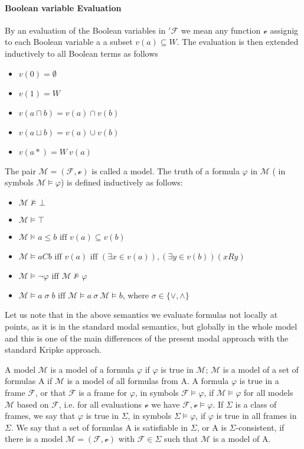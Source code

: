 \documentclass{article}
\begin{document}
	\paragraph{Boolean variable Evaluation}
By  an evaluation of the Boolean variables in $'\mathcal{F}$ we mean any function $\mathscr{v}$ assignig to each Boolean variable a a subset $v(a) \subseteq W$. The evaluation is then extended inductively to all Boolean terms as follows
		\begin{itemize}
			\item $v(0) = \emptyset$
			\item $v(1) = W$
			\item $v(a \sqcap b) = v(a) \cap v(b)$
			\item $v(a \sqcup b) = v(a) \cup v(b)$
			\item $v(a*) = W \ v(a)$
		\end{itemize}

The pair $\mathcal{M} = (\mathcal{F}, \mathscr{v})$ is called a model. The truth of a formula $\varphi$ in $\mathcal{M}$ ( in symbols $\mathcal{M} \models \varphi$) is defined inductively as follows:
		\begin{itemize}
			\item $\mathcal{M} \not\models \bot$ 
			\item $\mathcal{M} \models \top$
			\item $\mathcal{M} \models a \leq b \text{ iff } v(a) \subseteq v(b)$
			\item $\mathcal{M} \models aCb \text{ iff } v(a) \text{ iff } (\exists x \in v(a)), (\exists y \in v(b)) (xRy)$
			\item $\mathcal{M} \models \neg \varphi \text{ iff } \mathcal{M} \not\models \varphi$
			\item $\mathcal{M} \models a \; \sigma \; b \text{ iff } \mathcal{M} \models a \: \sigma \: \mathcal{M} \models b$, where $\sigma \in \{ \vee, \wedge \}$
		\end{itemize}
Let us note that in the above semantics we evaluate formulas not locally at points, as it is in the standard modal semantics, but globally in the whole model and this is one of the main differences of the present modal approach with the standard Kripke approach.

A model $\mathcal{M}$ is a model of a formula $\varphi$  if $\varphi$ is true in $\mathcal{M}$; $\mathcal{M}$ is a model of a set of formulas A if $\mathcal{M}$ is 
a model of all formulas from A. A formula $\varphi$ is true in a frame $\mathcal{F}$, or that $\mathcal{F}$ is a frame for $\varphi$, in symbols $\mathcal{F} \models \varphi$,
if $\mathcal{M} \models \varphi$ for all models $\mathcal{M}$ based on $\mathcal{F}$, i.e. for all evaluations $\mathscr{v}$ we have $\mathcal{F}, \mathscr{v} \models \varphi$.
If $\Sigma$ is a class of frames, we say that $\varphi$ is true in $\Sigma$, in symbols $\Sigma \models \varphi$, if $\varphi$ is true in all frames in $\Sigma$. We say that a set of 
formulas A is satisfiable in $\Sigma$, or A is $\Sigma$-consistent, if there is a model $\mathcal{M} = (\mathcal{F}, \mathscr{v})$ with $\mathcal{F} \in \Sigma$ such that $\mathcal{M}$
is a model of A.
	\newpage
\end{document}
